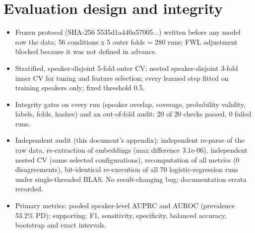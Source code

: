 \documentclass[10pt,a4paper]{article}
\begin{document}
\section{Evaluation design and integrity}\label{sec:eval}
\begin{itemize}\item Frozen protocol (SHA-256 5535d1a440a57005...) written before any model saw the data; 56 conditions x 5 outer folds = 280 runs; FWL adjustment blocked because it was not defined in advance.
\item Stratified, speaker-disjoint 5-fold outer CV; nested speaker-disjoint 3-fold inner CV for tuning and feature selection; every learned step fitted on training speakers only; fixed threshold 0.5.
\item Integrity gates on every run (speaker overlap, coverage, probability validity, labels, folds, hashes) and an out-of-fold audit: 20 of 20 checks passed, 0 failed runs.
\item Independent audit (this document's appendix): independent re-parse of the raw data, re-extraction of embeddings (max difference 3.1e-06), independent nested CV (same selected configurations), recomputation of all metrics (0 disagreements), bit-identical re-execution of all 70 logistic-regression runs under single-threaded BLAS. No result-changing bug; documentation errata recorded.
\item Primary metrics: pooled speaker-level AUPRC and AUROC (prevalence 53.2\% PD); supporting: F1, sensitivity, specificity, balanced accuracy, bootstrap and exact intervals.
\end{itemize}
\end{document}
